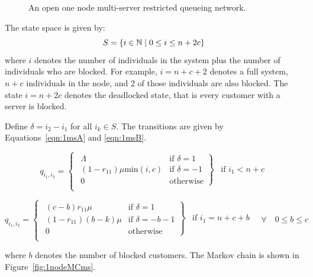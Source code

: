 \documentclass{article}
\numberwithin{equation}{section}
\begin{document}
\begin{figure}[!htbp]
  \begin{center}
  
  \end{center}
  \caption{An open one node multi-server restricted queueing network.}
  \label{fig:queueingnetwork_1nodemulti}
\end{figure}

The state space is given by:
        \[S = \{i\in\mathbb{N} \nonscript\; | \nonscript\; 0 \leq i \leq n + 2c\}\]
where \(i\) denotes the number of individuals in the system plus the number of
individuals who are blocked.
For example, $i=n+c+2$ denotes a full system, $n+c$ individuals in the node,
and 2 of those individuals are also blocked.
The state $i=n+2c$ denotes the deadlocked state, that is every customer with a
server is blocked.

Define $\delta = i_2 - i_1$ for all $i_k \in S$.
The transitions are given by Equations~\ref{eqn:1msA} and \ref{eqn:1msB}.

\begin{equation}\label{eqn:1msA}
  q_{i_1, i_2} = \left\{
  \begin{array}{rr}
    \left. \begin{array}{rr}
      \Lambda & \text{if } \delta = 1 \\
      (1-r_{11})\mu\text{min}(i, c) & \text{if } \delta = -1 \\
      0 & \text{otherwise}
    \end{array} \right\} & \text{if } i_1 < n + c \\
  \end{array} \right.
\end{equation}

\begin{equation}\label{eqn:1msB}
  q_{i_1, i_2} = \left\{
  \begin{array}{rr}
    \left. \begin{array}{rr}
      (c-b)r_{11}\mu & \text{if } \delta = 1 \\
      (1-r_{11})(b-k)\mu & \text{if } \delta = -b-1\\
      0 & \text{otherwise}
    \end{array} \right\} & \text{if } i_1 = n + c + b \\
  \end{array} \right.
  \quad \forall \quad 0 \leq b \leq c
\end{equation}

where $b$ denotes the number of blocked customers.
The Markov chain is shown in Figure~\ref{fig:1nodeMCms}.
\end{document}
